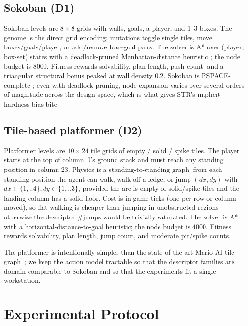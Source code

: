 \documentclass[conference]{IEEEtran}
\begin{document}
\subsection{Sokoban (\textbf{D1})}

Sokoban levels are $8\times 8$ grids with walls, goals, a player, and
1--3 boxes. The genome is the direct grid encoding; mutations toggle
single tiles, move boxes/goals/player, or add/remove box--goal
pairs. The solver is A* over (player, box-set) states with a
deadlock-pruned Manhattan-distance heuristic
\cite{junghanns2001sokoban}; the node budget is $8000$. Fitness
rewards solvability, plan length, push count, and a triangular
structural bonus peaked at wall density $0.2$. Sokoban is
PSPACE-complete \cite{culberson1999sokoban}; even with deadlock
pruning, node expansion varies over several orders of magnitude
across the design space, which is what gives \textsf{STR}'s implicit
hardness bias bite.

\subsection{Tile-based platformer (\textbf{D2})}

Platformer levels are $10\times 24$ tile grids of empty / solid /
spike tiles. The player starts at the top of column~0's ground stack
and must reach any standing position in column $23$. Physics is a
standing-to-standing graph: from each standing position the agent can
walk, walk-off-a-ledge, or jump $(dx,dy)$ with $dx\!\in\!\{1,..4\},
dy\!\in\!\{1,..3\}$, provided the arc is empty of solid/spike tiles
and the landing column has a solid floor. Cost is in game ticks
(one per row or column moved), so flat walking is cheaper than
jumping in unobstructed regions --- otherwise the descriptor
\#jumps would be trivially saturated. The solver is A* with a
horizontal-distance-to-goal heuristic; the node budget is $4000$.
Fitness rewards solvability, plan length, jump count, and moderate
pit/spike counts.

The platformer is intentionally simpler than the state-of-the-art
Mario-AI tile graph~\cite{volz2018evolving}; we keep the action
model tractable so that the descriptor families are
domain-comparable to Sokoban and so that the experiments fit a
single workstation.

\section{Experimental Protocol}
\label{sec:experiments}
\end{document}
